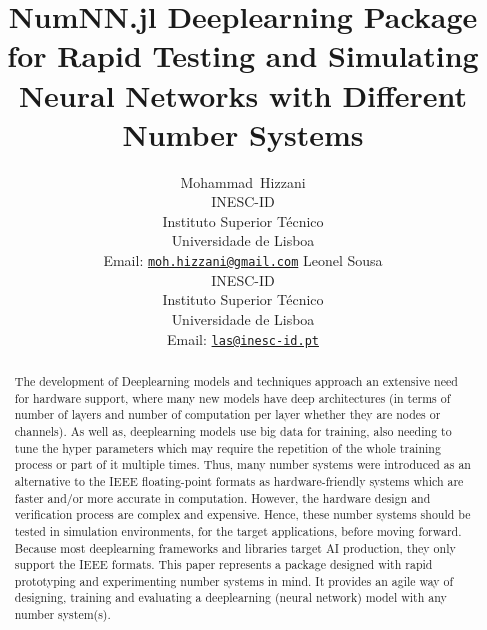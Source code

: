 \documentclass{article}
\title{NumNN.jl Deeplearning Package for Rapid Testing and Simulating Neural Networks with Different Number Systems}
\author{%
	{Mohammad~Hizzani}\\
	INESC-ID\\ 
	Instituto Superior Técnico\\ 
		Universidade de Lisboa\\
		Email: \href{mailto:moh.hizzani@gmail.com}{\tt moh.hizzani@gmail.com}%
	\And
	{Leonel Sousa}\\
	INESC-ID\\ 
		Instituto Superior Técnico\\ 
		Universidade de Lisboa\\
		Email: \href{mailto:las@inesc-id.pt}{\tt las@inesc-id.pt}%
}
\begin{document}
	\maketitle

	\begin{abstract}
		The development of Deeplearning models and techniques approach an extensive need for hardware support, where many new models have deep architectures (in terms of number of layers and number of computation per layer whether they are nodes or channels). As well as, deeplearning models use big data for training, also needing to tune the hyper parameters which may require the repetition of the whole training process or part of it multiple times. Thus, many number systems were introduced as an alternative to the IEEE floating-point formats as hardware-friendly systems which are faster and/or more accurate in computation. However, the hardware design and verification process are complex and expensive. Hence, these number systems should be tested in simulation environments, for the target applications, before moving forward. Because most deeplearning frameworks and libraries target AI production, they only support the IEEE formats. This paper represents a package designed with rapid prototyping and experimenting number systems in mind. It provides an agile way of designing, training and evaluating a deeplearning (neural network) model with any number system(s).
	\end{abstract}

	
	
	
	
	
%	
	
	
	
\end{document}
